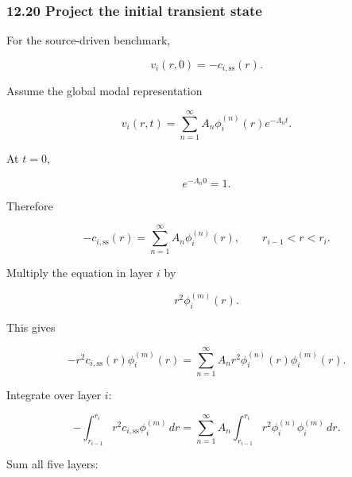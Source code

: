 \documentclass[11pt,a4paper]{article}
\begin{document}
\subsubsection*{12.20 Project the initial transient state}

For the source-driven benchmark,

\begin{equation}
v_i(r,0)
=
-c_{i,\mathrm{ss}}(r).
\tag{TRISO-ML-541}
\label{eq:triso-ml-541}
\end{equation}

Assume the global modal representation

\begin{equation}
v_i(r,t)
=
\sum_{n=1}^{\infty}
A_n
\phi_i^{(n)}(r)
e^{-\Lambda_nt}.
\tag{TRISO-ML-542}
\label{eq:triso-ml-542}
\end{equation}

At $t=0$,

\begin{equation}
e^{-\Lambda_n0}=1.
\tag{TRISO-ML-543}
\label{eq:triso-ml-543}
\end{equation}

Therefore

\begin{equation}
-c_{i,\mathrm{ss}}(r)
=
\sum_{n=1}^{\infty}
A_n\phi_i^{(n)}(r),
\qquad
r_{i-1}<r<r_i.
\tag{TRISO-ML-544}
\label{eq:triso-ml-544}
\end{equation}

Multiply the equation in layer $i$ by

\begin{equation}
r^2\phi_i^{(m)}(r).
\tag{TRISO-ML-545}
\label{eq:triso-ml-545}
\end{equation}

This gives

\begin{equation}
-r^2
c_{i,\mathrm{ss}}(r)
\phi_i^{(m)}(r)
=
\sum_{n=1}^{\infty}
A_n
r^2
\phi_i^{(n)}(r)
\phi_i^{(m)}(r).
\tag{TRISO-ML-546}
\label{eq:triso-ml-546}
\end{equation}

Integrate over layer $i$:

\begin{equation}
-\int_{r_{i-1}}^{r_i}
r^2
c_{i,\mathrm{ss}}
\phi_i^{(m)}
\,dr
=
\sum_{n=1}^{\infty}
A_n
\int_{r_{i-1}}^{r_i}
r^2
\phi_i^{(n)}
\phi_i^{(m)}
\,dr.
\tag{TRISO-ML-547}
\label{eq:triso-ml-547}
\end{equation}

Sum all five layers:
\end{document}
